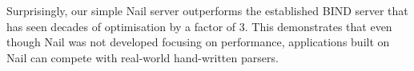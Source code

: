 Surprisingly, our simple Nail server outperforms the established BIND server that has seen decades
of optimisation by a factor of 3.  This demonstrates that even though Nail was
not developed focusing on performance, applications built on Nail can compete with real-world
hand-written parsers.



